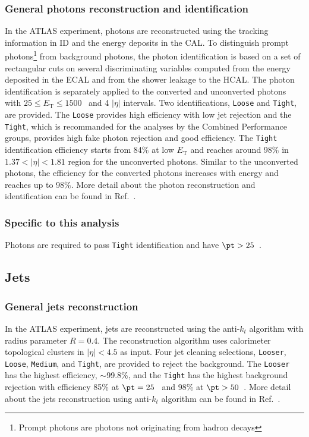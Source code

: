 \subsubsection{General photons reconstruction and identification}
\label{subsubsec:event_photons_general}
In the ATLAS experiment, photons are reconstructed using the tracking information in ID and the energy deposits in the CAL.
To distinguish prompt photons\footnote{Prompt photons are photons not originating from hadron decays} from background photons, the photon identification is based on a set of rectangular cuts on several discriminating variables computed from the energy deposited in the ECAL and from the shower leakage to the HCAL.
The photon identification is separately applied to the converted and unconverted photons with $25 \le E_{\mathrm{T}} \le 1500$~{\GeV} and 4 $|\eta|$ intervals.
Two identifications, \texttt{Loose} and \texttt{Tight}, are provided.
The \texttt{Loose} provides high efficiency with low jet rejection and the \texttt{Tight}, which is recommanded for the analyses by the Combined Performance groups, provides high fake photon rejection and good efficiency.
The \texttt{Tight} identification efficiency starts from 84\% at low $E_{\mathrm{T}}$ and reaches around 98\% in $1.37 < |\eta| < 1.81$ region for the unconverted photons.
Similar to the unconverted photons, the efficiency for the converted photons increases with energy and reaches up to 98\%.
More detail about the photon reconstruction and identification can be found in Ref.~\cite{ATLAS:2011kuc}.


\subsubsection{Specific to this analysis}
\label{subsubsec:event_photons_specific}
Photons are required to pass \texttt{Tight} identification and have $\pt > 25$~{\GeV}.


\subsection{Jets}
\label{subsec:event_jets}


\subsubsection{General jets reconstruction}
\label{subsubsec:event_jets_general}
In the ATLAS experiment, jets are reconstructed using the anti-$k_{t}$ algorithm with radius parameter $R = 0.4$.
The reconstruction algorithm uses calorimeter topological clusters in $|\eta| < 4.5$ as input.
Four jet cleaning selections, \texttt{Looser}, \texttt{Loose}, \texttt{Medium}, and \texttt{Tight}, are provided to reject the background.
The \texttt{Looser} has the highest efficiency, $\sim$99.8\%, and the \texttt{Tight} has the highest background rejection with efficiency 85\% at $\pt = 25$~{\GeV} and 98\% at $\pt > 50$~{\GeV}.
More detail about the jets reconstruction using anti-$k_{t}$ algorithm can be found in Ref.~\cite{Cacciari:2008gp}.

